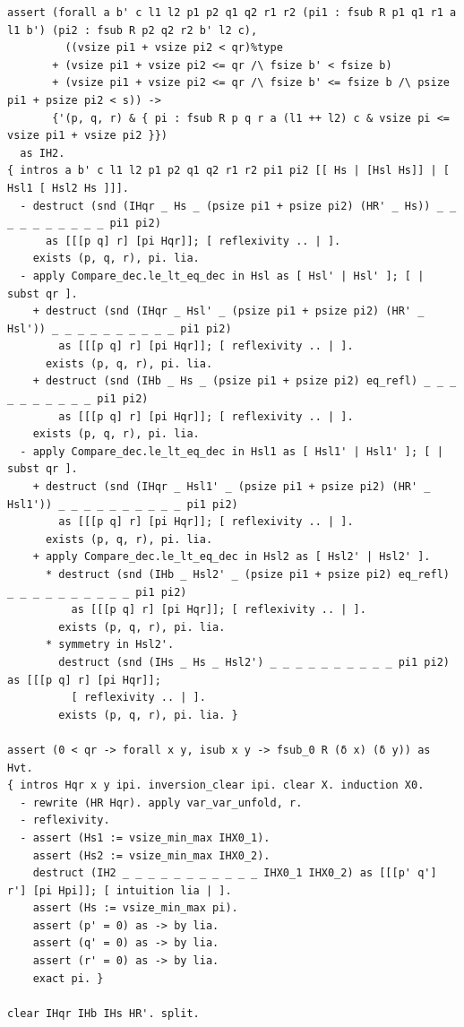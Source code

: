 \documentclass[10pt,a4paper]{article}
\begin{document}
\begin{lstlisting}
assert (forall a b' c l1 l2 p1 p2 q1 q2 r1 r2 (pi1 : fsub R p1 q1 r1 a l1 b') (pi2 : fsub R p2 q2 r2 b' l2 c),
         ((vsize pi1 + vsize pi2 < qr)%type
       + (vsize pi1 + vsize pi2 <= qr /\ fsize b' < fsize b)
       + (vsize pi1 + vsize pi2 <= qr /\ fsize b' <= fsize b /\ psize pi1 + psize pi2 < s)) ->
       {'(p, q, r) & { pi : fsub R p q r a (l1 ++ l2) c & vsize pi <= vsize pi1 + vsize pi2 }})
  as IH2.
{ intros a b' c l1 l2 p1 p2 q1 q2 r1 r2 pi1 pi2 [[ Hs | [Hsl Hs]] | [ Hsl1 [ Hsl2 Hs ]]].
  - destruct (snd (IHqr _ Hs _ (psize pi1 + psize pi2) (HR' _ Hs)) _ _ _ _ _ _ _ _ _ _ pi1 pi2)
      as [[[p q] r] [pi Hqr]]; [ reflexivity .. | ].
    exists (p, q, r), pi. lia.
  - apply Compare_dec.le_lt_eq_dec in Hsl as [ Hsl' | Hsl' ]; [ | subst qr ].
    + destruct (snd (IHqr _ Hsl' _ (psize pi1 + psize pi2) (HR' _ Hsl')) _ _ _ _ _ _ _ _ _ _ pi1 pi2)
        as [[[p q] r] [pi Hqr]]; [ reflexivity .. | ].
      exists (p, q, r), pi. lia.
    + destruct (snd (IHb _ Hs _ (psize pi1 + psize pi2) eq_refl) _ _ _ _ _ _ _ _ _ _ pi1 pi2)
        as [[[p q] r] [pi Hqr]]; [ reflexivity .. | ].
    exists (p, q, r), pi. lia.
  - apply Compare_dec.le_lt_eq_dec in Hsl1 as [ Hsl1' | Hsl1' ]; [ | subst qr ].
    + destruct (snd (IHqr _ Hsl1' _ (psize pi1 + psize pi2) (HR' _ Hsl1')) _ _ _ _ _ _ _ _ _ _ pi1 pi2)
        as [[[p q] r] [pi Hqr]]; [ reflexivity .. | ].
      exists (p, q, r), pi. lia.
    + apply Compare_dec.le_lt_eq_dec in Hsl2 as [ Hsl2' | Hsl2' ].
      * destruct (snd (IHb _ Hsl2' _ (psize pi1 + psize pi2) eq_refl) _ _ _ _ _ _ _ _ _ _ pi1 pi2)
          as [[[p q] r] [pi Hqr]]; [ reflexivity .. | ].
        exists (p, q, r), pi. lia.
      * symmetry in Hsl2'.
        destruct (snd (IHs _ Hs _ Hsl2') _ _ _ _ _ _ _ _ _ _ pi1 pi2) as [[[p q] r] [pi Hqr]];
          [ reflexivity .. | ].
        exists (p, q, r), pi. lia. }

assert (0 < qr -> forall x y, isub x y -> fsub_0 R (δ x) (δ y)) as Hvt.
{ intros Hqr x y ipi. inversion_clear ipi. clear X. induction X0.
  - rewrite (HR Hqr). apply var_var_unfold, r.
  - reflexivity.
  - assert (Hs1 := vsize_min_max IHX0_1).
    assert (Hs2 := vsize_min_max IHX0_2).
    destruct (IH2 _ _ _ _ _ _ _ _ _ _ _ IHX0_1 IHX0_2) as [[[p' q'] r'] [pi Hpi]]; [ intuition lia | ].
    assert (Hs := vsize_min_max pi).
    assert (p' = 0) as -> by lia.
    assert (q' = 0) as -> by lia.
    assert (r' = 0) as -> by lia.
    exact pi. }

clear IHqr IHb IHs HR'. split.


\end{lstlisting}
\end{document}
